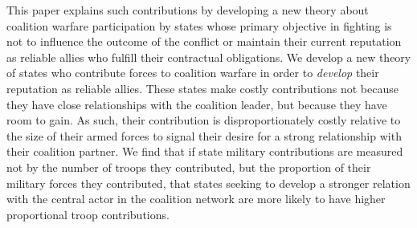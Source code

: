 \documentclass[12pt,letterpaper]{article}
\begin{document}
	This paper explains such contributions by developing a new theory about coalition warfare participation by states whose primary objective in fighting is not to influence the outcome of the conflict or maintain their current reputation as reliable allies who fulfill their contractual obligations. We develop a new theory of states who contribute forces to coalition warfare in order to \textit{develop} their reputation as reliable allies. These states make costly contributions not because they have close relationships with the coalition leader, but because they have room to gain. As such, their contribution is disproportionately costly relative to the size of their armed forces to signal their desire for a strong relationship with their coalition partner. We find that if state military contributions are measured not by the number of troops they contributed, but the proportion of their military forces they contributed, that states seeking to develop a stronger relation with the central actor in the coalition network are more likely to have higher proportional troop contributions.
\end{document}
